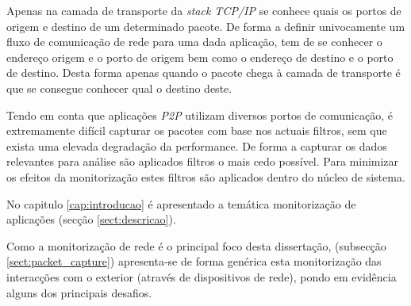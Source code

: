 Apenas na camada de transporte da \textit{stack TCP/IP} se conhece quais os portos de origem e destino de um determinado pacote. De forma a definir univocamente um fluxo de comunicação de rede para uma dada aplicação, tem de se conhecer o endereço origem e o porto de origem bem como o endereço de destino e o porto de destino. Desta forma apenas quando o pacote chega à camada de transporte é que se consegue conhecer qual o destino deste.

Tendo em conta que aplicações \textit{P2P} utilizam diversos portos de comunicação, é extremamente difícil capturar os pacotes com base nos actuais filtros, sem que exista uma elevada degradação da performance. De forma a capturar os dados relevantes para análise são aplicados filtros o mais cedo possível. Para minimizar os efeitos da monitorização estes filtros são aplicados dentro do núcleo de sistema.


% 
\bigskip 

No capitulo \ref{cap:introducao} é apresentado a temática monitorização de aplicações (secção \ref{sect:descricao}).

Como a monitorização de rede é o principal foco desta dissertação, (subsecção \ref{sect:packet_capture}) apresenta-se de forma genérica esta monitorização das interacções com o exterior (através de dispositivos de rede), pondo em evidência alguns dos principais desafios.

